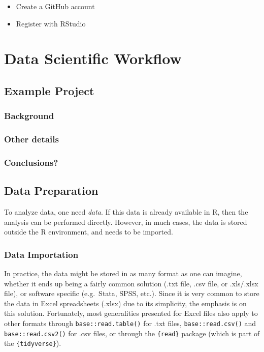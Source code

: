 \documentclass[
]{book}
\providecommand{\tightlist}{%
  \setlength{\itemsep}{0pt}\setlength{\parskip}{0pt}}
\begin{document}
\begin{itemize}
\tightlist
\item
  Create a GitHub account
\item
  Register with RStudio
\end{itemize}

\hypertarget{part-data-scientific-workflow}{%
\part*{Data Scientific Workflow}\label{part-data-scientific-workflow}}

\hypertarget{ex_proj}{%
\chapter{Example Project}\label{ex_proj}}

\hypertarget{background}{%
\section{Background}\label{background}}

\hypertarget{other-details}{%
\section{Other details}\label{other-details}}

\hypertarget{conclusions}{%
\section{Conclusions?}\label{conclusions}}

\hypertarget{data_prep}{%
\chapter{Data Preparation}\label{data_prep}}

To analyze data, one need \emph{data}. If this data is already available in R, then the analysis can be performed directly. However, in much cases, the data is stored outside the R environment, and needs to be imported.

\hypertarget{data-importation}{%
\section{Data Importation}\label{data-importation}}

In practice, the data might be stored in as many format as one can imagine, whether it ends up being a fairly common solution (.txt file, .csv file, or .xls/.xlsx file), or software specific (e.g.~Stata, SPSS, etc.).
Since it is very common to store the data in Excel spreadsheets (.xlsx) due to its simplicity, the emphasis is on this solution. Fortunately, most generalities presented for Excel files also apply to other formats through \texttt{base::read.table()} for .txt files, \texttt{base::read.csv()} and \texttt{base::read.csv2()} for .csv files, or through the \texttt{\{read\}} package (which is part of the \texttt{\{tidyverse\}}).
\end{document}
